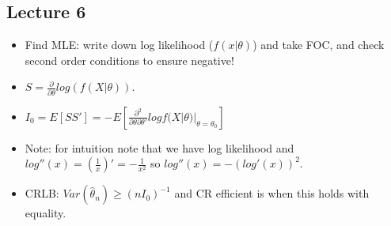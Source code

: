 \documentclass[11pt]{article} %
\begin{document}
\subsection{Lecture 6}
\begin{itemize}
\item Find MLE: write down log likelihood ($f(x|\theta)$) and take FOC, and check second order conditions to ensure negative!
\item $S = \frac{\partial}{\partial \theta}log(f(X|\theta)).$
\item $I_0 = E[SS'] = -E\left[ \frac{\partial^2}{\partial\theta\partial\theta'}log f(X|\theta)|_{\theta = \theta_0} \right]$
\item Note: for intuition note that we have log likelihood and $log''(x) =  (\frac{1}{x})' = -\frac{1}{x^2}$ so $log''(x) =- (log'(x))^2.$
\item CRLB: $Var(\hat{\theta}_n) \geq (nI_0)^{-1}$ and CR efficient is when this holds with equality.
\end{itemize}
\end{document}
